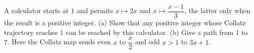 A calculator starts at $1$ and permits $x\mapsto2x$ and $x\mapsto\dfrac{x-1}{3}$, the latter only when the result is a positive integer. (a) Show that any positive integer whose Collatz trajectory reaches $1$ can be reached by this calculator. (b) Give a path from $1$ to $7$. Here the Collatz map sends even $x$ to $\dfrac{x}{2}$ and odd $x>1$ to $3x+1$.
